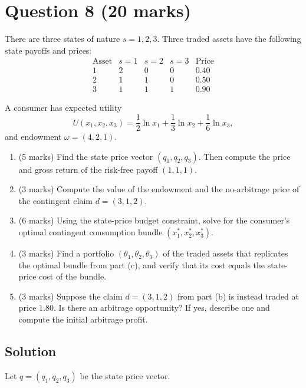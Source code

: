 \documentclass[12pt]{article}
\begin{document}
\bigskip

\newpage
\section*{Question 8 (20 marks)}

There are three states of nature $s=1,2,3$. Three traded assets have the following state payoffs and prices:
\[
\begin{array}{c|ccc|c}
\text{Asset} & s=1 & s=2 & s=3 & \text{Price} \\
\hline
1 & 2 & 0 & 0 & 0.40 \\
2 & 1 & 1 & 0 & 0.50 \\
3 & 1 & 1 & 1 & 0.90
\end{array}
\]

A consumer has expected utility
\[
U(x_1,x_2,x_3)=\frac12\ln x_1+\frac13\ln x_2+\frac16\ln x_3,
\]
and endowment $\omega=(4,2,1)$.

\begin{enumerate}[label=(\alph*)]
\item (5 marks) Find the state price vector $(q_1,q_2,q_3)$. Then compute the price and gross return of the risk-free payoff $(1,1,1)$.
\item (3 marks) Compute the value of the endowment and the no-arbitrage price of the contingent claim $d=(3,1,2)$.
\item (6 marks) Using the state-price budget constraint, solve for the consumer's optimal contingent consumption bundle $(x_1^*,x_2^*,x_3^*)$.
\item (3 marks) Find a portfolio $(\theta_1,\theta_2,\theta_3)$ of the traded assets that replicates the optimal bundle from part (c), and verify that its cost equals the state-price cost of the bundle.
\item (3 marks) Suppose the claim $d=(3,1,2)$ from part (b) is instead traded at price $1.80$. Is there an arbitrage opportunity? If yes, describe one and compute the initial arbitrage profit.
\end{enumerate}

\subsection*{Solution}

Let $q=(q_1,q_2,q_3)$ be the state price vector.
\end{document}
